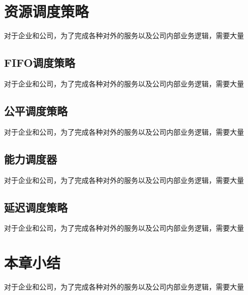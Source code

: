 \section{资源调度策略}

对于企业和公司，为了完成各种对外的服务以及公司内部业务逻辑，需要大量

\subsection{FIFO调度策略}
对于企业和公司，为了完成各种对外的服务以及公司内部业务逻辑，需要大量
\subsection{公平调度策略}
对于企业和公司，为了完成各种对外的服务以及公司内部业务逻辑，需要大量
\subsection{能力调度器}
对于企业和公司，为了完成各种对外的服务以及公司内部业务逻辑，需要大量
\subsection{延迟调度策略}
对于企业和公司，为了完成各种对外的服务以及公司内部业务逻辑，需要大量

\section{本章小结}

对于企业和公司，为了完成各种对外的服务以及公司内部业务逻辑，需要大量
